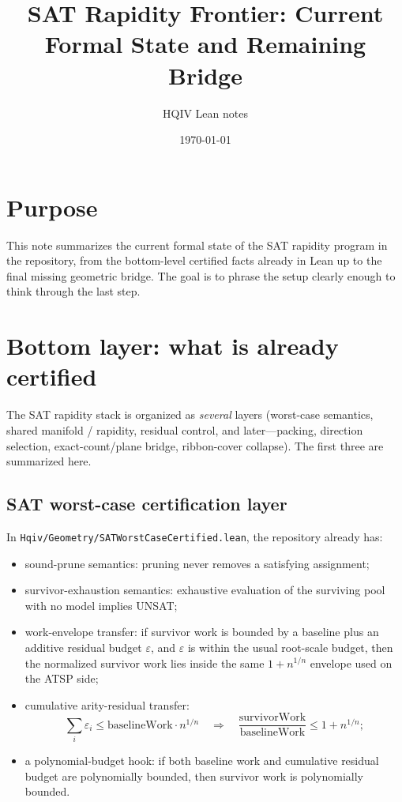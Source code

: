 \documentclass[11pt]{article}
\title{SAT Rapidity Frontier: Current Formal State and Remaining Bridge}
\author{HQIV Lean notes}
\date{\today}
\begin{document}
\maketitle

\section*{Purpose}

This note summarizes the current formal state of the SAT rapidity program in the
repository, from the bottom-level certified facts already in Lean up to the final
missing geometric bridge. The goal is to phrase the setup clearly enough to think
through the last step.

\section{Bottom layer: what is already certified}

The SAT rapidity stack is organized as \emph{several} layers (worst-case semantics,
shared manifold / rapidity, residual control, and later---packing, direction selection,
exact-count/plane bridge, ribbon-cover collapse).  The first three are summarized here.

\subsection{SAT worst-case certification layer}

In \texttt{Hqiv/Geometry/SATWorstCaseCertified.lean}, the repository already has:

\begin{itemize}[leftmargin=2em]
  \item sound-prune semantics: pruning never removes a satisfying assignment;
  \item survivor-exhaustion semantics: exhaustive evaluation of the surviving pool
  with no model implies UNSAT;
  \item work-envelope transfer: if survivor work is bounded by a baseline plus an
  additive residual budget $\varepsilon$, and $\varepsilon$ is within the usual
  root-scale budget, then the normalized survivor work lies inside the same
  \(1 + n^{1/n}\) envelope used on the ATSP side;
  \item cumulative arity-residual transfer:
  \[
    \sum_i \varepsilon_i \leq \text{baselineWork} \cdot n^{1/n}
    \quad \Longrightarrow \quad
    \frac{\text{survivorWork}}{\text{baselineWork}} \leq 1 + n^{1/n};
  \]
  \item a polynomial-budget hook:
  if both baseline work and cumulative residual budget are polynomially bounded,
  then survivor work is polynomially bounded.
\end{itemize}
\end{document}
